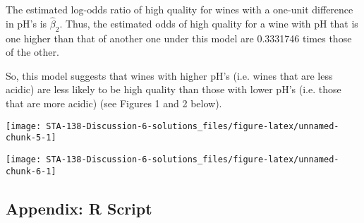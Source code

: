 \documentclass[
]{article}
\begin{document}
\begin{enumerate}
The estimated log-odds ratio of high quality for wines with a one-unit difference in pH's is $\hat\beta_2$. Thus, the estimated odds of high quality for a wine with pH that is one higher than that of another one under this model are 0.3331746 times those of the other.

So, this model suggests that wines with higher pH's (i.e. wines that are less acidic) are less likely to be high quality than those with lower pH's (i.e. those that are more acidic) (see Figures 1 and 2 below).



\end{enumerate}

\begin{center}\texttt{[image: STA-138-Discussion-6-solutions\_files/figure-latex/unnamed-chunk-5-1]} \end{center}

\begin{center}\texttt{[image: STA-138-Discussion-6-solutions\_files/figure-latex/unnamed-chunk-6-1]} \end{center}

\vfill

\pagebreak

\subsection*{Appendix: R Script}
\end{document}
